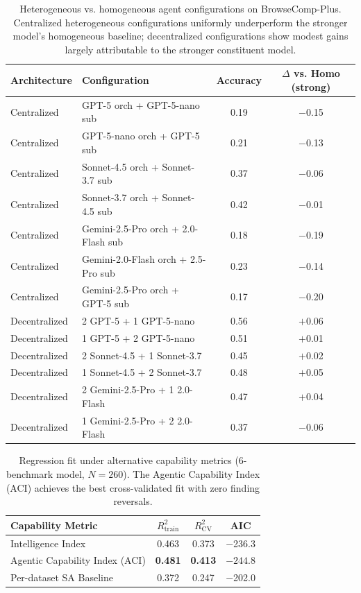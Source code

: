 \begin{table}[h]
\centering
\small
\caption{Heterogeneous vs. homogeneous agent configurations on BrowseComp-Plus. Centralized heterogeneous configurations uniformly underperform the stronger model's homogeneous baseline; decentralized configurations show modest gains largely attributable to the stronger constituent model.}
\begin{tabular}{llcc}
\toprule
\textbf{Architecture} & \textbf{Configuration} & \textbf{Accuracy} & \textbf{$\Delta$ vs. Homo (strong)} \\
\midrule
Centralized & GPT-5 orch + GPT-5-nano sub & 0.19 & $-$0.15 \\
Centralized & GPT-5-nano orch + GPT-5 sub & 0.21 & $-$0.13 \\
Centralized & Sonnet-4.5 orch + Sonnet-3.7 sub & 0.37 & $-$0.06 \\
Centralized & Sonnet-3.7 orch + Sonnet-4.5 sub & 0.42 & $-$0.01 \\
Centralized & Gemini-2.5-Pro orch + 2.0-Flash sub & 0.18 & $-$0.19 \\
Centralized & Gemini-2.0-Flash orch + 2.5-Pro sub & 0.23 & $-$0.14 \\
Centralized & Gemini-2.5-Pro orch + GPT-5 sub & 0.17 & $-$0.20 \\
\midrule
Decentralized & 2 GPT-5 + 1 GPT-5-nano & 0.56 & $+$0.06 \\
Decentralized & 1 GPT-5 + 2 GPT-5-nano & 0.51 & $+$0.01 \\
Decentralized & 2 Sonnet-4.5 + 1 Sonnet-3.7 & 0.45 & $+$0.02 \\
Decentralized & 1 Sonnet-4.5 + 2 Sonnet-3.7 & 0.48 & $+$0.05 \\
Decentralized & 2 Gemini-2.5-Pro + 1 2.0-Flash & 0.47 & $+$0.04 \\
Decentralized & 1 Gemini-2.5-Pro + 2 2.0-Flash & 0.37 & $-$0.06 \\
\bottomrule
\end{tabular}
\label{tab:s2_heterogeneous}
\end{table}

\begin{table}[h]
\centering
\small
\caption{Regression fit under alternative capability metrics (6-benchmark model, $N=260$). The Agentic Capability Index (ACI) achieves the best cross-validated fit with zero finding reversals.}
\begin{tabular}{lccc}
\toprule
\textbf{Capability Metric} & $R^2_{\text{train}}$ & $R^2_{\text{CV}}$ & \textbf{AIC} \\
\midrule
Intelligence Index & 0.463 & 0.373 & $-$236.3 \\
Agentic Capability Index (ACI) & \textbf{0.481} & \textbf{0.413} & $\mathbf{-244.8}$ \\
Per-dataset SA Baseline & 0.372 & 0.247 & $-$202.0 \\
\bottomrule
\end{tabular}
\label{tab:s3_aci}
\end{table}

